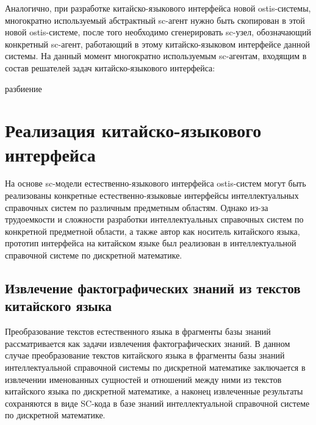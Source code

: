 Аналогично, при разработке китайско-языкового интерфейса новой ostis-системы, многократно используемый абстрактный sc-агент нужно быть скопирован в этой новой ostis-системе, после того необходимо сгенерировать sc-узел, обозначающий конкретный sc-агент, работающий в этому китайско-языковом интерфейсе данной системы. На данный момент многократно используемым sc-агентам, входящим в состав решателей задач китайско-языкового интерфейса:
\begin{SCn}
	\begin{scnrelfromset}{разбиение}
	\end{scnrelfromset}
\end{SCn}

\section {Реализация китайско-языкового интерфейса}
На основе sc-модели естественно-языкового интерфейса ostis-систем могут быть реализованы конкретные естественно-языковые интерфейсы интеллектуальных справочных систем по различным предметным областям. Однако из-за трудоемкости и сложности разработки интеллектуальных справочных систем по конкретной предметной области, а также автор как носитель китайского языка, прототип интерфейса на китайском языке был реализован в интеллектуальной справочной системе по дискретной математике.

\subsection{Извлечение фактографических знаний из текстов китайского языка}
Преобразование текстов естественного языка в фрагменты базы знаний рассматривается как задачи извлечения фактографических знаний. В данном случае преобразование текстов китайского языка в фрагменты базы знаний интеллектуальной справочной системы по дискретной математике заключается в извлечении именованных сущностей и отношений между ними из текстов китайского языка по дискретной математике, а наконец извлеченные результаты сохраняются в виде SC-кода в базе знаний интеллектуальной справочной системе по дискретной математике.

